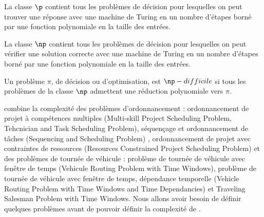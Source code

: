
\begin{mydef}
La classe $\p$ contient tous les problèmes de décision pour lesquelles on peut trouver une réponse avec une machine de Turing en un nombre d'étapes borné par une fonction polynomiale en la taille des entrées.
\end{mydef}
\begin{mydef}
La classe $\np$ contient tous les problèmes de décision pour lesquelles on peut vérifier une solution correcte avec une machine de Turing en un nombre d'étapes borné par une fonction polynomiale en la taille des entrées.
\end{mydef}
\begin{mydef}
Un problème $\pi$, de décision ou d'optimisation, est $ \np-difficile$ si tous les problèmes de la classe $\np$ admettent une réduction polynomiale vers $\pi$. 
\end{mydef}


\wsrp combine la complexité des problèmes d'ordonnancement \cite{Blazewicz1983,Lageweg1982} : ordonnancement de projet à compétences multiples (Multi-skill Project Scheduling Problem, Tehcnician and Task Scheduling Problem), séquençage et ordonnancement de tâches (Sequencing and Scheduling Problem) \cite{Lawler1993}, ordonnancement de projet avec contraintes de ressources (Resources Constrained Project Scheduling Problem) et des problèmes de tournée de véhicule \cite{Lenstra2013,Tsitsiklis1992} : problème de tournée de véhicule avec fenêtre de temps (Vehicule Routing Problem with Time Windows), problème de tournée de véhicule avec fenêtre de temps, dépendance temporelle (Vehicle Routing Problem with Time Windows and Time Dependancies) et Traveling Salesman Problem with Time Windows. Nous allons avoir besoin de définir quelques problèmes  avant de pouvoir définir la complexité de \wsrp.











\indent 


\begin{comment}
La Figure~\ref{Fig:Complexite} montre le lien entre les problèmes défini plus haut.


\begin{figure}[H]
\centering
\texttt{[image: RCPSP]}
\caption{\label{RCPSP} Exemple de problème d'ordonnancement de projet avec contrainte de ressources.La ligne en pointillé représente la contrainte de ressources, l'ordonnancement du bas est une solution réalisable alors que celui du haut est une solution qui ne respecte pas la contrainte de ressource}
\end{figure}
\end{comment}


